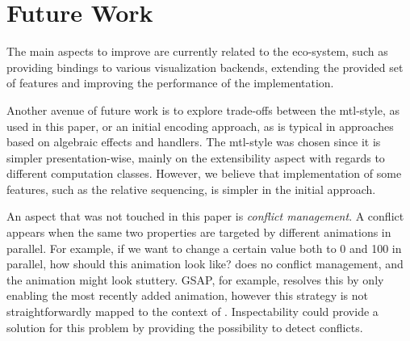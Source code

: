 \section{Future Work}
\label{sec:future}

The main aspects to improve are currently related to the \dsl{} eco-system, such as providing bindings to various visualization backends, extending the provided set of features and improving the performance of the implementation.

Another avenue of future work is to explore trade-offs between the mtl-style, as used in this paper, or an initial encoding approach, as is typical in approaches based on algebraic effects and handlers. The mtl-style was chosen since it is simpler presentation-wise, mainly on the extensibility aspect with regards to different computation classes. However, we believe that implementation of some features, such as the relative sequencing, is simpler in the initial approach.

An aspect that was not touched in this paper is \emph{conflict management}. A conflict appears when the same two properties are targeted by different animations in parallel. For example, if we want to change a certain value both to 0 and 100 in parallel, how should this animation look like? \dsl{} does no conflict management, and the animation might look stuttery. GSAP, for example, resolves this by only enabling the most recently added animation, however this strategy is not straightforwardly mapped to the context of \dsl{}. Inspectability could provide a solution for this problem by providing the possibility to detect conflicts.
